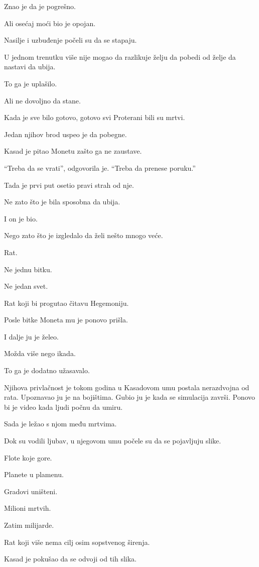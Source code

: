 Znao je da je pogrešno.

Ali osećaj moći bio je opojan.

Nasilje i uzbuđenje počeli su da se stapaju.

U jednom trenutku više nije mogao da razlikuje želju da pobedi od želje da nastavi da ubija.

To ga je uplašilo.

Ali ne dovoljno da stane.

Kada je sve bilo gotovo, gotovo svi Proterani bili su mrtvi.

Jedan njihov brod uspeo je da pobegne.

Kasad je pitao Monetu zašto ga ne zaustave.

``Treba da se vrati'', odgovorila je. ``Treba da prenese poruku.''

Tada je prvi put osetio pravi strah od nje.

Ne zato što je bila sposobna da ubija.

I on je bio.

Nego zato što je izgledalo da želi nešto mnogo veće.

Rat.

Ne jednu bitku.

Ne jedan svet.

Rat koji bi progutao čitavu Hegemoniju.

\bigskip

Posle bitke Moneta mu je ponovo prišla.

I dalje ju je želeo.

Možda više nego ikada.

To ga je dodatno užasavalo.

Njihova privlačnost je tokom godina u Kasadovom umu postala nerazdvojna od rata. Upoznavao ju je na bojištima. Gubio ju je kada se simulacija završi. Ponovo bi je video kada ljudi počnu da umiru.

Sada je ležao s njom među mrtvima.

Dok su vodili ljubav, u njegovom umu počele su da se pojavljuju slike.

Flote koje gore.

Planete u plamenu.

Gradovi uništeni.

Milioni mrtvih.

Zatim milijarde.

Rat koji više nema cilj osim sopstvenog širenja.

Kasad je pokušao da se odvoji od tih slika.

